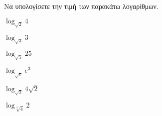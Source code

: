 Να υπολογίσετε την τιμή των παρακάτω λογαρίθμων.
\begin{multicols}{3}
\begin{rlist}[leftmargin=3mm]
\item $ \log_{\sqrt{2}}{4} $
\item $ \log_{\sqrt{3}}{3} $
\item $ \log_{\sqrt{5}}{25} $
\item $ \log_{\sqrt{e}}{e^3} $
\item $ \log_{\sqrt{2}}{4\sqrt{2}} $
\item $ \log_{\sqrt[3]{4}}{2} $
\end{rlist}
\end{multicols}

